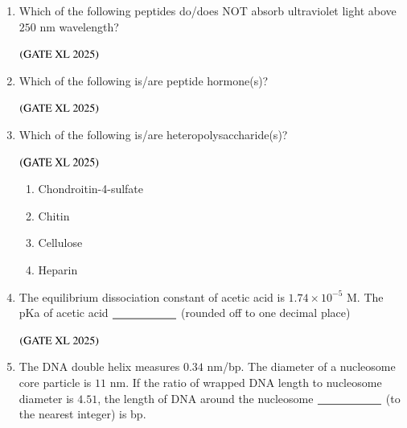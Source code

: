 \documentclass[journal]{IEEEtran}
\begin{document}
\begin{enumerate}
    \item Which of the following peptides do/does NOT absorb ultraviolet light above $250$ nm wavelength?

    \hfill $\left(\text{GATE XL 2025}\right)$

    \begin{enumerate}
    \end{enumerate}

    \item Which of the following is/are peptide hormone(s)?

    \hfill $\left(\text{GATE XL 2025}\right)$

    \begin{enumerate}
    \end{enumerate}

    \item Which of the following is/are heteropolysaccharide(s)?

    \hfill $\left(\text{GATE XL 2025}\right)$

    \begin{enumerate}
        \item Chondroitin-4-sulfate
        \item Chitin
        \item Cellulose
        \item Heparin
    \end{enumerate}

    \item The equilibrium dissociation constant of acetic acid is $1.74 \times 10^{-5}$ M. The pKa of acetic acid $\underline{\rule{2cm}{0pt}}$ (rounded off to one decimal place)

    \hfill $\left(\text{GATE XL 2025}\right)$

    \item The DNA double helix measures $0.34$ nm/bp. The diameter of a nucleosome core particle is $11$ nm. If the ratio of wrapped DNA length to nucleosome diameter is $4.51$, the length of DNA around the nucleosome $\underline{\rule{2cm}{0pt}}$ (to the nearest integer) is bp.


\end{enumerate}
\end{document}
